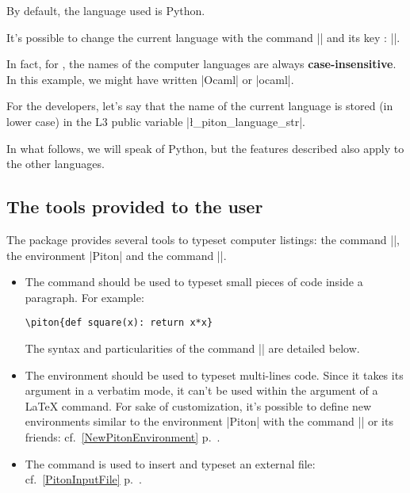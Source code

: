 \documentclass{article}
\begin{document}
\smallskip
By default, the language used is Python.

\smallskip
{}
It's possible to change the current language with the command |\PitonOptions|
and its key : ||.

\smallskip
In fact, for , the names of the computer languages are always
\textbf{case-insensitive}. In this example, we might have written |Ocaml| or
|ocaml|. 

\smallskip
For the developers, let's say that the name of the current language is stored
(in lower case) in the L3 public variable |\l_piton_language_str|.

\smallskip
In what follows, we will speak of Python, but the features described also
apply to the other languages.

\subsection{The tools provided to the user}


The package  provides several tools to typeset computer listings: the
command |\piton|, the environment |{Piton}| and the command |\PitonInputFile|.

\begin{itemize}
\item The command  should be used to typeset small
pieces of code inside a paragraph. For example:

{\color{gray}\verb|\piton{def square(x): return x*x}|}\qquad 
{}

The syntax and particularities of the command |\piton| are detailed below.

\item The environment  should be used to
typeset multi-lines code. Since it takes its argument in a verbatim mode, it
can't be used within the argument of a LaTeX command. For sake of
customization, it's possible to define new environments similar to the
environment |{Piton}| with the command |\NewPitonEnvironment| or its friends:
cf.~\ref{NewPitonEnvironment} p.~\pageref{NewPitonEnvironment}.

\item The command  is used to insert and
typeset an external file: cf.~\ref{PitonInputFile}
p.~\pageref{PitonInputFile}.


\end{itemize}
\end{document}
